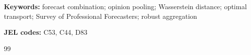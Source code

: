 \documentclass[12pt]{article}
\numberwithin{equation}{section}
\begin{document}
\bigskip
\noindent\textbf{Keywords:} forecast combination; opinion pooling; Wasserstein distance;
optimal transport; Survey of Professional Forecasters; robust aggregation

\bigskip
\noindent\textbf{JEL codes:} C53, C44, D83

\newpage



\begin{thebibliography}{99}

\end{thebibliography}
\end{document}
